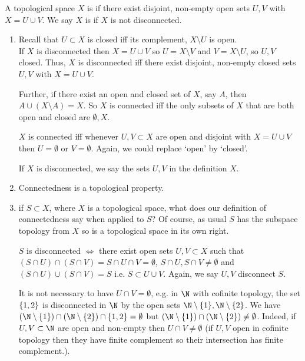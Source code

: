 \begin{definition}[Connectedness]
A topological space $X$ is  if there exist disjoint, non-empty open sets $U,V$ with $X = U\cup V$.
We say $X$ is  if $X$ is not disconnected.
\end{definition}

\begin{remark}
    \begin{enumerate}
        \item Recall that $U\subset X$ is closed iff its complement, $X \setminus U$ is open. \\
        If $X$ is disconnected then $X = U \cup V$ so $U = X \setminus V$ and $V = X \setminus U$, so $U, V$ closed.
        Thus, $X$ is disconnected iff there exist disjoint, non-empty closed sets $U,V$ with $X = U\cup V$.
        
        Further, if there exist an open and closed set of $X$, say $A$, then $A \cup (X \setminus A) = X$.
        So $X$ is connected iff the only subsets of $X$ that are both open and closed are $\emptyset, X$.
        
        $X$ is connected iff whenever $U,V\subset X$ are open and disjoint with $X=U\cup V$ then $U=\emptyset$ or $V=\emptyset$. Again, we could replace `open' by `closed'.

        If $X$ is disconnected, we say the sets $U,V$ in the definition  $X$.

        \item Connectedness is a topological property.
        \item if $S\subset X$, where $X$ is a topological space, what does our definition of connectedness say when applied to $S$? Of course, as usual $S$ has the subspace topology from $X$ so is a topological space in its own right. 

        $S$ is disconnected $\iff$ there exist open sets $U,V\subset X$ such that $(S \cap U) \cap (S \cap V) = S\cap U\cap V = \emptyset$, $S \cap U, S \cap V \neq \emptyset$ and $(S \cap U) \cup (S \cap V) = S$ i.e. $S\subset U\cup V$. Again, we say $U,V$ disconnect $S$.
        
        \begin{warning}
            It is not necessary to have $U\cap V =\emptyset$, e.g. in $\N$ with cofinite topology, the set $\{1,2\}$ is disconnected in $\N$ by the open sets $\N\setminus \set{1}, \N\setminus \set{2}$. We have $(\N\setminus \set{1}) \cap (\N\setminus \set{2})\cap \set{1,2} = \emptyset$ but $(\N\setminus \set{1})\cap (\N\setminus \set{2}) \neq \emptyset$. Indeed, if $U,V\subset \N$ are open and non-empty then $U\cap V\neq\emptyset$ (if $U, V$ open in cofinite topology then they have finite complement so their intersection has finite complement.).
        \end{warning} 
        

\end{enumerate}
\end{remark}
